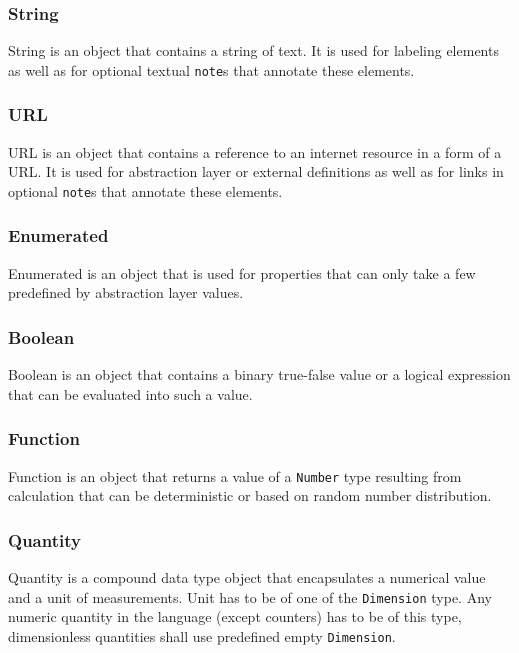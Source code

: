 \documentclass{article}
\begin{document}
\subsubsection{String}

String is an object that contains a string of text. It is used for labeling
elements as well as for optional textual {\tt note}s that annotate these
elements.

\subsubsection{URL}

URL is an object that contains a reference to an internet resource in a form
of a URL. It is used for abstraction layer or external definitions as well as
for links in optional {\tt note}s that annotate these elements.

\subsubsection{Enumerated}

Enumerated is an object that is used for properties that can only take
a few predefined by abstraction layer values.

\subsubsection{Boolean}

Boolean is an object that contains a binary true-false value or a logical
expression that can be evaluated into such a value.

\subsubsection{Function}

Function is an object that returns a value of a {\tt Number} type resulting
from calculation that can be deterministic or based on random number
distribution.

\subsubsection{Quantity}

Quantity is a compound data type object that encapsulates a numerical value
and a unit of measurements. Unit has to be of one of the {\tt Dimension} type.
Any numeric quantity in the language (except counters) has to be of this type,
dimensionless quantities shall use predefined empty {\tt Dimension}.
\end{document}
